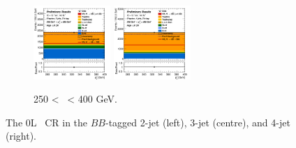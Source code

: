 \begin{figure}[h!]
\begin{subfigure}[b]{\textwidth}
        \includegraphics[width=0.32\textwidth]{Images/VH/Own_fit/postfit_VHbb/Region_distpTV_BMax400_BMin250_DCRHigh_J3_TTypebb_T2_L0_Y6051_GlobalFit_conditionnal_mu1.png}
        \includegraphics[width=0.32\textwidth]{Images/VH/Own_fit/postfit_VHbb/Region_distpTV_BMax400_BMin250_DCRHigh_J4_TTypebb_T2_L0_Y6051_GlobalFit_conditionnal_mu1.png}
        \caption{250 < \ptv\ < 400 GeV.}
        \label{fig:plots_VHbb_OL_250_CRH}
    \end{subfigure}
    \caption{The 0L \highdr\ CR in the $BB$-tagged 2-jet (left), 3-jet (centre), and 4-jet (right).}
    \label{fig:plots_VHbb_OL_CRH}
\end{figure} 

\vspace*{\fill} 


